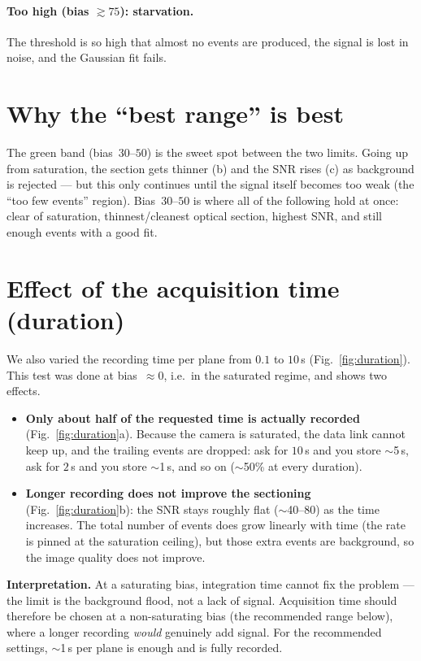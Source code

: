 \documentclass[11pt,a4paper]{article}
\begin{document}
\paragraph{Too high (bias $\gtrsim 75$): starvation.}
The threshold is so high that almost no events are produced, the signal is lost in noise,
and the Gaussian fit fails.

\section{Why the ``best range'' is best}
The green band (bias~$30$--$50$) is the sweet spot between the two limits. Going up from
saturation, the section gets thinner (b) and the SNR rises (c) as background is rejected ---
but this only continues until the signal itself becomes too weak (the ``too few events''
region). Bias~$30$--$50$ is where all of the following hold at once: clear of saturation,
thinnest/cleanest optical section, highest SNR, and still enough events with a good fit.

\section{Effect of the acquisition time (duration)}
We also varied the recording time per plane from $0.1$ to $10$\,s
(Fig.~\ref{fig:duration}). This test was done at bias~$\approx 0$, i.e.\ in the saturated
regime, and shows two effects.

\begin{itemize}
  \item \textbf{Only about half of the requested time is actually recorded}
  (Fig.~\ref{fig:duration}a). Because the camera is saturated, the data link cannot keep up,
  and the trailing events are dropped: ask for $10$\,s and you store $\sim$5\,s, ask for
  $2$\,s and you store $\sim$1\,s, and so on ($\sim$50\% at every duration).
  \item \textbf{Longer recording does not improve the sectioning}
  (Fig.~\ref{fig:duration}b): the SNR stays roughly flat ($\sim$40--80) as the time
  increases. The total number of events does grow linearly with time (the rate is pinned at
  the saturation ceiling), but those extra events are background, so the image quality does
  not improve.
\end{itemize}

\medskip
\noindent\textbf{Interpretation.}
At a saturating bias, integration time cannot fix the problem --- the limit is the
background flood, not a lack of signal. Acquisition time should therefore be chosen at a
non-saturating bias (the recommended range below), where a longer recording \emph{would}
genuinely add signal. For the recommended settings, $\sim$1\,s per plane is enough and is
fully recorded.
\end{document}
